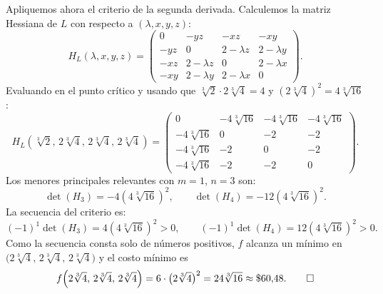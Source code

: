 \documentclass[11pt,respuestas,a4]{aleph-examen}
\begin{document}
\begin{preguntas}
\begin{respuesta}
Apliquemos ahora el criterio de la segunda derivada. Calculemos la matriz Hessiana de $L$ con respecto a $(\lambda,x,y,z)$:
\[
    H_L(\lambda,x,y,z)
    =
    \begin{pmatrix}
        0 & -yz & -xz & -xy\\[4pt]
        -yz & 0 & 2-\lambda z & 2-\lambda y\\[4pt]
        -xz & 2-\lambda z & 0 & 2-\lambda x\\[4pt]
        -xy & 2-\lambda y & 2-\lambda x & 0
    \end{pmatrix}.
\]
Evaluando en el punto crítico y usando que $\sqrt[3]{2}\cdot 2\sqrt[3]{4} = 4$ y $(2\sqrt[3]{4})^2 = 4\sqrt[3]{16}$:
\[
    H_L\!\left(\sqrt[3]{2},\,2\sqrt[3]{4},\,2\sqrt[3]{4},\,2\sqrt[3]{4}\right)
    =
    \begin{pmatrix}
        0 & -4\sqrt[3]{16} & -4\sqrt[3]{16} & -4\sqrt[3]{16}\\[4pt]
        -4\sqrt[3]{16} & 0 & -2 & -2\\[4pt]
        -4\sqrt[3]{16} & -2 & 0 & -2\\[4pt]
        -4\sqrt[3]{16} & -2 & -2 & 0
    \end{pmatrix}.
\]
Los menores principales relevantes con $m=1$, $n=3$ son:
\[
    \det(H_3) = -4(4\sqrt[3]{16})^2,
    \qquad
    \det(H_4) = -12(4\sqrt[3]{16})^2.
\]
La secuencia del criterio es:
\[
    (-1)^1\det(H_3) = 4(4\sqrt[3]{16})^2 > 0,
    \qquad
    (-1)^1\det(H_4) = 12(4\sqrt[3]{16})^2 > 0.
\]
Como la secuencia consta solo de números positivos, $f$ alcanza un {mínimo} en $\bigl(2\sqrt[3]{4},\,2\sqrt[3]{4},\,2\sqrt[3]{4}\bigr)$ y el costo mínimo es
\[
    f\!\left(2\sqrt[3]{4},\,2\sqrt[3]{4},\,2\sqrt[3]{4}\right)
    =
    6\cdot\bigl(2\sqrt[3]{4}\bigr)^2
    =
    24\sqrt[3]{16}
    \approx \$60{,}48.\qedhere
\]
\end{respuesta}

\end{preguntas}
\end{document}
